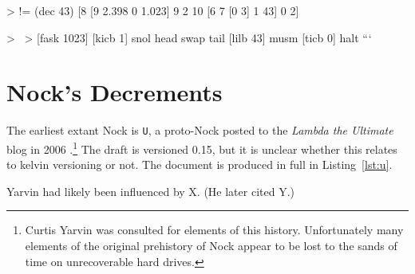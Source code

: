 \documentclass[twoside]{article}
\begin{document}
> !=  (dec 43)
[8 [9 2.398 0 1.023] 9 2 10 [6 7 [0 3] 1 43] 0 2]

> ~>  %
{[fask 1023] [kicb 1] snol head swap tail [lilb 43] musm [ticb 0] halt}
```


\section{Nock's Decrements}

The earliest extant Nock is \texttt{U}, a proto-Nock posted to the \textit{Lambda the Ultimate} blog in 2006 \citep{Yarvin2006}.\footnote{Curtis Yarvin was consulted for elements of this history.  Unfortunately many elements of the original prehistory of Nock appear to be lost to the sands of time on unrecoverable hard drives.}  The draft is versioned 0.15, but it is unclear whether this relates to kelvin versioning or not.  The document is produced in full in Listing~\ref{lst:u}.

Yarvin had likely been influenced by X.
(He later cited Y.)
\end{document}
